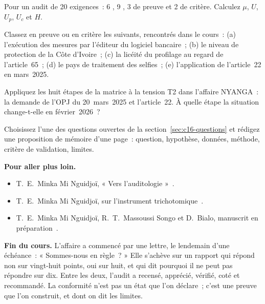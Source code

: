 \begin{boxexo}[title={\ding{45}\quad Exercice~19.1. Calculer \niveaubase}]
Pour un audit de 20 exigences~: 6 \OUI{}, 9 \NON{}, 3 \NEK{} de preuve et
2 \NEK{} de critère. Calculez $\mu$, $U$, $U_p$, $U_c$ et $H$.
\end{boxexo}

\begin{boxexo}[title={\ding{45}\quad Exercice~19.2. Classer les NEK \niveaumoyen}]
Classez en preuve ou en critère les \NEK{} suivants, rencontrés dans le
cours~: (a) l'exécution des mesures par l'éditeur du logiciel bancaire~;
(b) le niveau de protection de la Côte d'Ivoire~; (c) la licéité du
profilage au regard de l'article~65~; (d) le pays de traitement des
selfies~; (e) l'application de l'article~22 en mars~2025.
\end{boxexo}

\begin{boxexo}[title={\ding{45}\quad Exercice~19.3. La matrice \niveaumoyen}]
Appliquez les huit étapes de la matrice à la tension T2 dans l'affaire
NYANGA~: la demande de l'OPJ du 20~mars~2025 et l'article~22. À quelle
étape la situation change-t-elle en février~2026~?
\end{boxexo}

\begin{boxexo}[title={\ding{45}\quad Exercice~19.4. Un sujet de mémoire \niveauexpert}]
Choisissez l'une des questions ouvertes de la section~\ref{sec:c16-questions}
et rédigez une proposition de mémoire d'une page~: question, hypothèse,
données, méthode, critère de validation, limites.
\end{boxexo}

\bigskip

\begin{boxinfo}
\textbf{Pour aller plus loin.}
\begin{itemize}
    \item T.~E.~Minka Mi Nguidjoï, « Vers l'auditologie »~\cite{minka2026auditologie}.
    \item T.~E.~Minka Mi Nguidjoï, sur l'instrument trichotomique~\cite{minka2026nek}.
    \item T.~E.~Minka Mi Nguidjoï, R.~T.~Massoussi Songo et D.~Bialo,
          manuscrit en préparation~\cite{minka2026chainepenale}.
\end{itemize}
\end{boxinfo}

\begin{boxinfo}
\textbf{Fin du cours.} L'affaire a commencé par une lettre, le lendemain
d'une échéance~: « Sommes-nous en règle~? » Elle s'achève sur un rapport
qui répond non sur vingt-huit points, oui sur huit, et qui dit pourquoi il
ne peut pas répondre sur dix. Entre les deux, l'audit a recensé, apprécié,
vérifié, coté et recommandé. La conformité n'est pas un état que l'on
déclare~; c'est une preuve que l'on construit, et dont on dit les limites.
\end{boxinfo}
